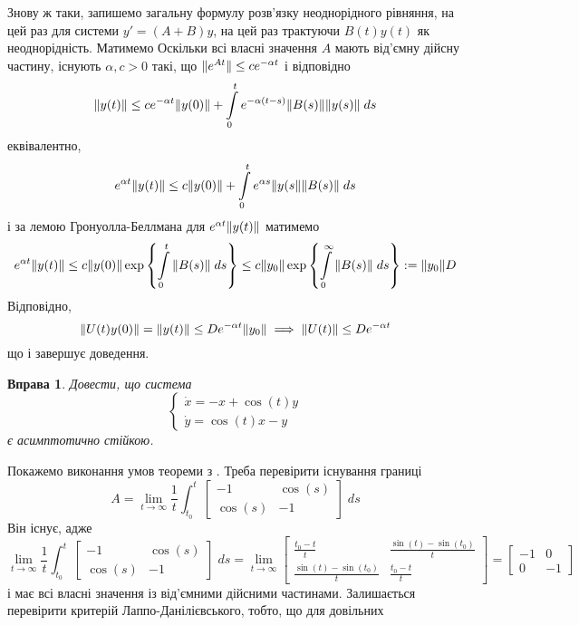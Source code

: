 \documentclass[12pt]{article} %
\newtheorem{prob}{Вправа}
\begin{document}
Знову ж таки, запишемо загальну формулу розв’язку неоднорідного рівняння, на цей раз для системи $y'=(A+B)y$, на цей раз трактуючи $B(t)y(t)$ як
неоднорідність. Матимемо
Оскільки всі власні значення $A$ мають від’ємну дійсну частину, існують $\alpha,c>0$ такі, що $\|e^{At}\|\leq ce^{-\alpha t}$ і відповідно
\[\mynorm{y(t)}\leq ce^{-\alpha t}\mynorm{y(0)}+\int_0^te^{-\alpha(t-s)}\mynorm{B(s)}\mynorm{y(s)}\;ds\]
еквівалентно,
\[e^{\alpha t}\mynorm{y(t)}\leq c\mynorm{y(0)}+\int_0^te^{\alpha s}\mynorm{y(s}\mynorm{B(s)}\;ds\]
і за лемою Гронуолла-Беллмана для $e^{\alpha t}\|y(t)\|$ матимемо
\[e^{\alpha t}\mynorm{y(t)}\leq c\mynorm{y(0)}\exp\mycbra{\int_0^t\mynorm{B(s)}\;ds}\leq c\mynorm{y_0}\exp\mycbra{\int_0^{\infty}\mynorm{B(s)}\;ds}
:=\mynorm{y_0}D\]
Відповідно,
\[\|U(t)y(0)\|=\|y(t)\|\leq De^{-\alpha t}\|y_0\|\implies\|U(t)\|\leq De^{-\alpha t}\]
що і завершує доведення.
\begin{prob}Довести, що система \[\begin{cases}\dot{x}=-x+\cos(t)y\\\dot{y}=\cos(t)x-y\end{cases}\]є асимптотично стійкою.\end{prob}
Покажемо виконання умов теореми з \cite[\S13]{demidovich}. Треба перевірити існування границі
\[A=\lim_{t\to\infty}\frac{1}{t}\int_{t_0}^t\begin{bmatrix}-1&\cos(s)\\\cos(s)&-1\end{bmatrix}\;ds\]
Він існує, адже
\[\lim_{t\to\infty}\frac{1}{t}\int_{t_0}^t\begin{bmatrix}-1&\cos(s)\\\cos(s)&-1\end{bmatrix}\;ds=\lim_{t\to\infty}\begin{bmatrix}
	\frac{t_0-t}{t}&\frac{\sin(t)-\sin(t_0)}{t}\\\frac{\sin(t)-\sin(t_0)}{t}&\frac{t_0-t}{t}\end{bmatrix}=\begin{bmatrix}-1&0\\0&-1\end{bmatrix}
		\]
і має всі власні значення із від’ємними дійсними частинами. Залишається перевірити критерій Лаппо-Данілієвського, тобто, що для довільних
\end{document}
